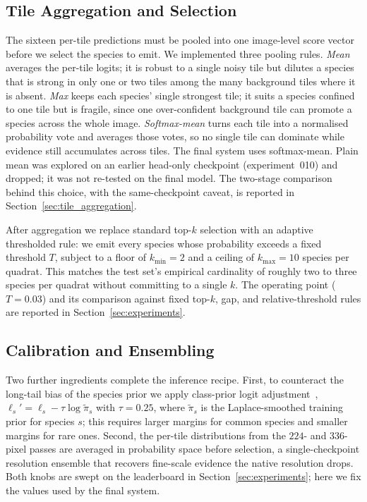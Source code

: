 \subsection{Tile Aggregation and Selection}
\label{sec:tile_agg_method}

The sixteen per-tile predictions must be pooled into one image-level score vector before we
select the species to emit. We implemented three pooling rules. \emph{Mean} averages the per-tile
logits; it is robust to a single noisy tile but dilutes a species that is strong in only one or
two tiles among the many background tiles where it is absent. \emph{Max} keeps each species'
single strongest tile; it suits a species confined to one tile but is fragile, since one
over-confident background tile can promote a species across the whole image. \emph{Softmax-mean}
turns each tile into a normalised probability vote and averages those votes, so no single tile can
dominate while evidence still accumulates across tiles. The final system uses softmax-mean. Plain mean was explored on an earlier head-only checkpoint
(experiment~010) and dropped; it was not re-tested on the final model. The two-stage comparison
behind this choice, with the same-checkpoint caveat, is reported in
Section~\ref{sec:tile_aggregation}.

After aggregation we replace standard top-$k$ selection with an adaptive thresholded rule: we emit
every species whose probability exceeds a fixed threshold $T$, subject to a floor of $k_{\min}{=}2$
and a ceiling of $k_{\max}{=}10$ species per quadrat. This matches the test set's empirical
cardinality of roughly two to three species per quadrat without committing to a single $k$. The
operating point ($T{=}0.03$) and its comparison against fixed top-$k$, gap, and relative-threshold
rules are reported in Section~\ref{sec:experiments}.

\subsection{Calibration and Ensembling}
\label{sec:calibration}

Two further ingredients complete the inference recipe. First, to counteract the long-tail bias of
the species prior we apply class-prior logit adjustment~\cite{menon2021longtail},
$\ell_s' = \ell_s - \tau \log \tilde{\pi}_s$ with $\tau{=}0.25$, where $\tilde{\pi}_s$ is the
Laplace-smoothed training prior for species $s$; this requires larger margins for common species
and smaller margins for rare ones. Second, the per-tile distributions from the $224$- and
$336$-pixel passes are averaged in probability space before selection, a single-checkpoint
resolution ensemble that recovers fine-scale evidence the native resolution drops. Both knobs are
swept on the leaderboard in Section~\ref{sec:experiments}; here we fix the values used by the
final system.

